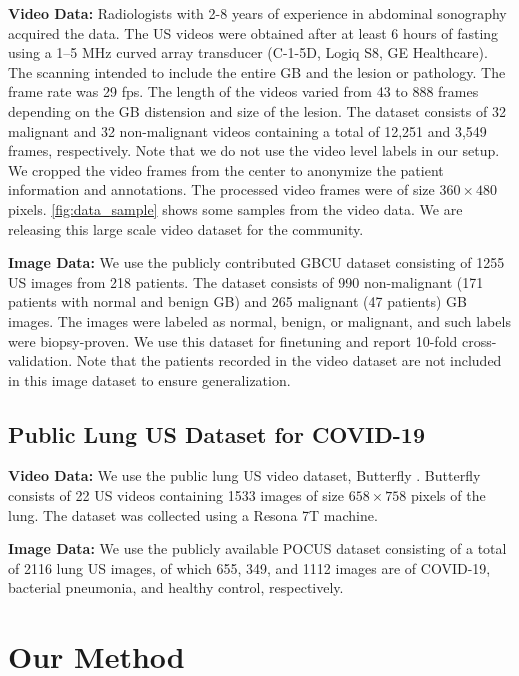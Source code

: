\documentclass[runningheads]{llncs}
\newcommand{\myfirstpara}[1]{\par \noindent \textbf{#1:}}
\newcommand{\mypara}[1]{ \myfirstpara{#1}}
\begin{document}
\mypara{Video Data}
%
Radiologists with 2-8 years of experience in abdominal sonography acquired the data. The US videos were obtained after at least 6 hours of fasting using a 1--5 MHz curved array transducer (C-1-5D, Logiq S8, GE Healthcare). The scanning intended to include the entire GB and the lesion or pathology. The frame rate was 29 fps. The length of the videos varied from 43 to 888 frames depending on the GB distension and size of the lesion. The dataset consists of 32 malignant and 32 non-malignant videos containing a total of 12,251 and 3,549 frames, respectively. Note that we do not use the video level labels in our setup. We cropped the video frames from the center to anonymize the patient information and annotations. The processed video frames were of size $360\!\times\!480$ pixels. \cref{fig:data_sample} shows some samples from the video data. We are releasing this large scale video dataset for the community.

\mypara{Image Data}
%
We use the publicly contributed GBCU dataset \cite{basu2022surpassing} consisting of 1255 US images from 218 patients. The dataset consists of 990 non-malignant (171 patients with normal and benign GB) and 265 malignant (47 patients) GB images. The images were labeled as normal, benign, or malignant, and such labels were biopsy-proven. We use this dataset for finetuning and report 10-fold cross-validation. 
Note that the patients recorded in the video dataset are not included in this image dataset to ensure generalization. 

\subsection{Public Lung US Dataset for COVID-19}

\myfirstpara{Video Data}
%
We use the public lung US video dataset, Butterfly \cite{butterfly}. Butterfly consists of 22 US videos containing 1533 images of size $658\!\times\!758$ pixels of the lung. The dataset was collected using a Resona 7T machine.

\mypara{Image Data}
%
We use the publicly available POCUS \cite{pocus} dataset consisting of a total of 2116 lung US images, of which 655, 349, and 1112 images are of COVID-19, bacterial pneumonia, and healthy control, respectively.

%
%
\section{Our Method}
\end{document}
